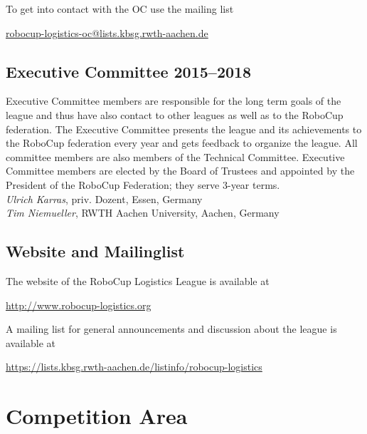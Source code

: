 \documentclass[12pt,twoside]{article}
\begin{document}
To get into contact with the OC use the mailing list\\
\centerline{\url{robocup-logistics-oc@lists.kbsg.rwth-aachen.de}}

\subsection{Executive Committee 2015--2018}
\label{sec:oc}
Executive Committee members are responsible for the long term goals of
the league and thus have also contact to other leagues as well as to
the RoboCup federation. The Executive Committee presents the league
and its achievements to the RoboCup federation every year and gets
feedback to organize the league. All committee members are also
members of the Technical Committee. Executive Committee members are
elected by the Board of Trustees and appointed by the President of the
RoboCup Federation; they serve 3-year terms.\\[.5em]
\emph{Ulrich Karras}, priv. Dozent, Essen, Germany\\
\emph{Tim Niemueller}, RWTH Aachen University, Aachen, Germany

\subsection{Website and Mailinglist}
\label{sec:website-ml}
The website of the RoboCup Logistics League is available at\\
\centerline{\url{http://www.robocup-logistics.org}}

\smallskip
\noindent
A mailing list for general announcements and discussion about the
league is available at\\
\centerline{\url{https://lists.kbsg.rwth-aachen.de/listinfo/robocup-logistics}}


\section{Competition Area} \label{sec:area}
\end{document}
